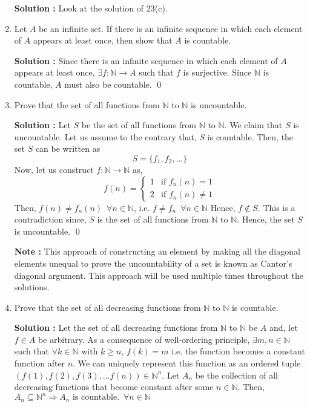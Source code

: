 \documentclass[10pt]{article}
\newcommand{\nn}{\mathbb{N}}
\begin{document}
\begin{enumerate}
	    \textbf{Solution : } Look at the solution of 23(c).
    \item Let $A$ be an infinite set. If there is an infinite sequence in which each element of $A$ appears at least once, then show that $A$ is countable.
    
    \textbf{Solution : } Since there is an infinite sequence in which each element of $A$ appears at least once, $\exists f : \nn \to A$ such that $f$ is surjective. Since $\nn$ is countable, $A$ must also be countable. \qed    
    \item Prove that the set of all functions from $\nn$ to $\nn$ is uncountable.

    \textbf{Solution : }Let $S$ be the set of all functions from $\nn$ to $\nn$. We claim that $S$ is uncountable. Let us assume to the contrary that, $S$ is countable. Then, the set $S$ can be written as $$S = \{f_1, f_2, \dots \}$$ Now, let us construct $f : \nn \to \nn$ as, 
    \begin{equation*}
        f(n) = 
        \begin{cases}
            1 & \text{if } f_n(n) = 1 \\
            2 & \text{if } f_n(n) \neq 1
        \end{cases}
    \end{equation*}
    Then, $f(n) \neq f_n(n) \,\,\, \forall n \in \nn$, i.e. $f \neq f_n \,\,\, \forall n \in \nn$ Hence, $f \notin S$. This is a contradiction since, $S$ is the set of all functions from $\nn$ to $\nn$. Hence, the set $S$ is uncountable. \qed

    \textbf{Note : }This approach of constructing an element by making all the diagonal elements unequal  to prove the uncountability of a set is known as 
    Cantor's diagonal argument. This approach will be used multiple times throughout the solutions.
    \item Prove that the set of all decreasing functions from $\nn$ to $\nn$ is countable.

	    \textbf{ Solution : }Let the set of all decreasing functions from $\nn$ to $\nn$ be $A$ and, let $f \in A$ be arbitrary.
	    As a consequence of well-ordering principle, $\exists m,n \in \nn$ such that $\forall k \in \nn \text{ with }k \geq n$, 
	    $f(k) = m$ i.e. the function becomes a constant function after $n$. We can uniquely
	    represent this function as an ordered tuple $(f(1), f(2), f(3), \dots f(n)) \in \nn^n$.
	    Let $A_n$ be the collection of all decreasing functions that become constant after some $n \in \nn$. Then, $A_n \subseteq \nn^n \Rightarrow A_n \text{ is countable.} \,\,\, \forall n \in \nn$


\end{enumerate}
\end{document}
